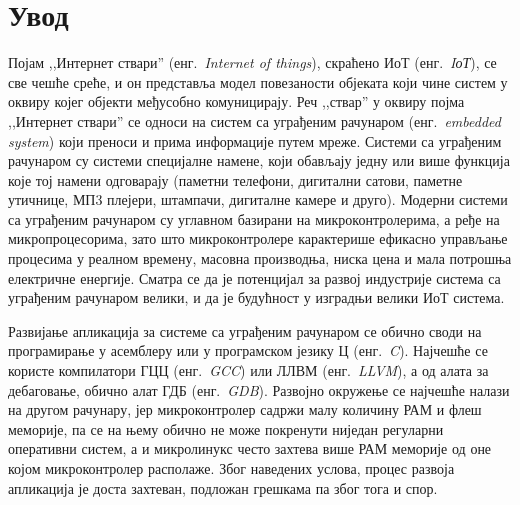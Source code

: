 \documentclass[12pt,oneside]{memoir}
\begin{document}
\frontmatter
\naslovna
\komisija
 \apstrakt
\tableofcontents*

\mainmatter

\chapter{Увод}
Појам ,,Интернет ствари'' (енг.~\textit{Internet of things}), скраћено ИоТ (енг.~\textit{IоТ}), се све чешће среће, и он представља модел повезаности објеката који чине систем у оквиру којег објекти међусобно комуницирају. Реч ,,ствар'' у оквиру појма ,,Интернет ствари'' се односи на систем са уграђеним рачунаром (енг.~\textit{embedded system}) који преноси и прима информације путем мреже. Системи са уграђеним рачунаром су системи специјалне намене, који обављају једну или више функција које тој намени одговарају (паметни телефони, дигитални сатови, паметне утичнице, МП3 плејери, штампачи, дигиталне камере и друго). Модерни системи са уграђеним рачунаром су углавном базирани на микроконтролерима, а ређе на микропроцесорима, зато што микроконтролере карактерише ефикасно управљање процесима у реалном времену, масовна производња, ниска цена и мала потрошња електричне енергије. Сматра се да је потенцијал за развој индустрије система са уграђеним рачунаром велики, и да је будућност у изградњи велики ИоТ система.

Развијање апликација за системе са уграђеним рачунаром се обично своди на програмирање у асемблеру или у програмском језику Ц (енг.~\textit{C}). Најчешће се користе компилатори ГЦЦ (енг.~\textit{GCC}) или ЛЛВМ (енг.~\textit{LLVM}), а од алата за дебаговање, обично алат ГДБ (енг.~\textit{GDB}). Развојно окружење се најчешће налази на другом рачунару, јер микроконтролер садржи малу количину РАМ и флеш меморије, па се на  њему обично не може покренути ниједан регуларни оперативни систем, а и микролинукс често захтева више РАМ меморије од оне којом микроконтролер располаже. Због наведених услова, процес развоја апликација је доста захтеван, подложан грешкама па због тога и спор.
\end{document}
